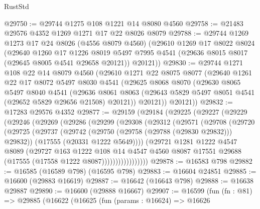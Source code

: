 \begin{lexlean}{RustStd}
\begin{coremodule}
@29750 := @29744 @1275 @108 @1221 @14 @8080 @4560
@29758 := @21483 @29576 @4352 @1269 @1271 @17 @22 @8026 @8079
@29788 := @29744
    @1269
    @1273
    @17
    @24
    @8026
    (@4556 @8079 @4560)
    (@29610
      @1269
      @17
      @8022
      @8024
      (@29640
        @1260
        @17
        @1226
        @8019
        @5497
        @7995
        @4541
        (@29636 @8015 @8017 (@29645 @8005 @4541 @29658 @20121))
        @20121))
@29830 := @29744
    @1271
    @108
    @22
    @14
    @8079
    @4560
    (@29610
      @1271
      @22
      @8075
      @8077
      (@29640
        @1261
        @22
        @17
        @8072
        @5497
        @8030
        @4541
        (@29625
          @8068
          @8070
          (@29630
            @8065
            @5497
            @8040
            @4541
            (@29636
              @8061
              @8063
              (@29643 @5829 @5497 @8051 @4541 (@29652 @5829 @29656 @21508) @20121))
            @20121))
        @20121))
@29832 := @17283 @29576 @4352
@29877 := @29159
    (@29184
      (@29225
        (@29227
          (@29229
            (@29246
              (@29269
                (@29286
                  (@29299
                    (@29308
                      (@29312
                        (@29571
                          (@29708
                            (@29720
                              (@29725
                                (@29737
                                  (@29742 (@29750 (@29758 (@29788 (@29830 @29832))) @29832))
                                  (@17555 (@20331 @1222 @5649))))
                              (@29721
                                @1281
                                @1222
                                @4547
                                @8089
                                (@29727
                                  @163
                                  @1222
                                  @108
                                  @14
                                  @4547
                                  @4560
                                  @8087
                                  @17551
                                  @29688
                                  (@17555 (@17558 @1222 @8087)))))))))))))))))
@29878 := @16583 @798
@29882 := @16585 (@16589 @798) (@16595 @798)
@29883 := @16604 @24851
@29885 := @16600 (@29883 @16619)
@29887 := @16642 (@16643 @798)
@29888 := @16638 @29887
@29890 := @16600 (@29888 @16667)
@29907 := @16599
    (fun (fn : @81) =>
    @29885
      (@16622
        (@16625
          (fun (params : @16624) =>
          @16626

\end{coremodule}
\end{lexlean}
